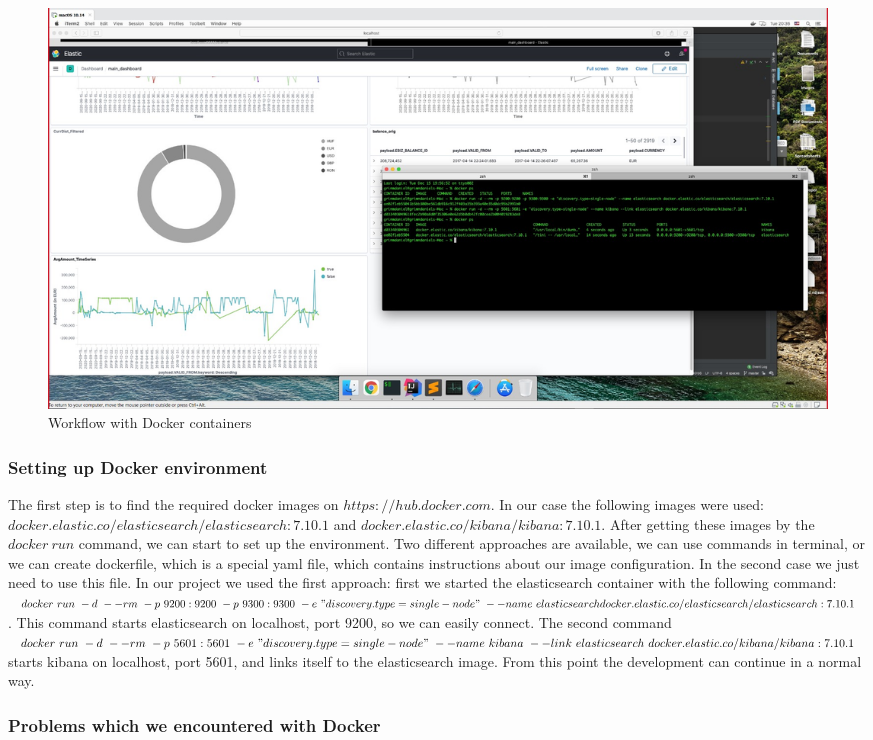 \documentclass{article}
\begin{document}
\begin{figure}[h!]
\centering
\includegraphics[width=\textwidth]{Docker_snapshot.jpg}
\caption{Workflow with Docker containers}
\label{fig:OuptutDashboard}
\end{figure}

\subsubsection{Setting up Docker environment}

The first step is to find the required docker images on $https://hub.docker.com$. In our case the following images were used: $docker.elastic.co/elasticsearch/elasticsearch:7.10.1$ and $docker.elastic.co/kibana/kibana:7.10.1$. After getting these images by the $docker\ run$ command, we can start to set up the environment. Two different approaches are available, we can use commands in terminal, or we can create dockerfile, which is a special yaml file, which contains instructions about our image configuration. In the second case we just need to use this file. In our project we used the first approach: first we started the elasticsearch container with the following command: $docker\ run\ -d\ --rm\ -p\ 9200:9200\ -p\ 9300:9300\ -e\ "discovery.type=single-node"\ --name\ elasticsearch docker.elastic.co/elasticsearch/elasticsearch:7.10.1$. This command starts elasticsearch on localhost, port 9200, so we can easily connect. The second command $docker\ run\ -d\ --rm\ -p\ 5601:5601\ -e\ "discovery.type=single-node"\ --name\ kibana\ --link\ 
elasticsearch\ docker.elastic.co/kibana/kibana:7.10.1$ starts kibana on localhost, port 5601, and links itself to the elasticsearch image. From this point the development can continue in a normal way.

\subsubsection{Problems which we encountered with Docker}
\end{document}
